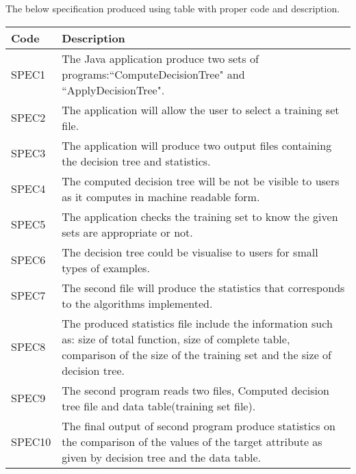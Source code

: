 \documentclass{report}
\begin{document}
The below specification produced using table with proper code and description. 
\begin{tabularx}{\textwidth}{|l|X|}
\hline
Code & Description\\
\hline
\hline 

SPEC1&

The Java application produce two sets of programs:``ComputeDecisionTree" and ``ApplyDecisionTree".
\\\hline

SPEC2&

The application will allow the user to select a training set file.
\\\hline

SPEC3&
The application will produce two output files containing the decision tree and statistics.
\\\hline

SPEC4&
The computed decision tree will be not be visible to users as it computes in machine readable form.
\\\hline

SPEC5&
The application checks the training set to know the given sets are appropriate or not.
\\\hline

SPEC6&
The decision tree could be visualise to users for small types of examples.
\\\hline

SPEC7&
The second file will produce the statistics that corresponds to the algorithms implemented.  
\\\hline

SPEC8&
The produced statistics file include the information such as: size of total function, size of complete table, comparison of the size of the training set and the size of decision tree. 
\\\hline

SPEC9&
The second program reads two files, Computed decision tree file and data table(training set file). 
\\\hline

SPEC10&
The final output of second program produce statistics on the comparison of the values of the target attribute as given by decision tree and the data table.
\\\hline

\end{tabularx}
\end{document}
